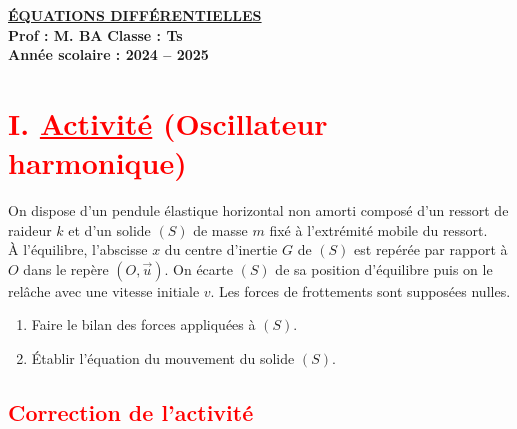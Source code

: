 \documentclass[a4paper,12pt]{article}
\begin{document}
\small

\begin{center}
    \Large\textbf{\underline{ÉQUATIONS DIFFÉRENTIELLES}}\\[-0.1cm]
    \normalsize\textbf{Prof : M. BA} \hfill \textbf{Classe : Ts}\\[-0.1cm]
    \textbf{Année scolaire : 2024 -- 2025}
\end{center}

\begin{center}
\end{center}

\section*{\textcolor{red}{I. \underline{Activité} (Oscillateur harmonique)}}
On dispose d’un pendule élastique horizontal non amorti composé d’un ressort de raideur $k$ et d’un solide $(S)$ de masse $m$ fixé à l’extrémité mobile du ressort.\\
À l’équilibre, l’abscisse $x$ du centre d’inertie $G$ de $(S)$ est repérée par rapport à $O$ dans le repère $(O,\overrightarrow{u})$. On écarte $(S)$ de sa position d’équilibre puis on le relâche avec une vitesse initiale $v$. Les forces de frottements sont supposées nulles.
\begin{enumerate}
    \item Faire le bilan des forces appliquées à $(S)$.
    \item Établir l’équation du mouvement du solide $(S)$.
\end{enumerate}

\vspace{0.5cm}

\subsection*{\textcolor{red}{Correction de l'activité}}
\end{document}
